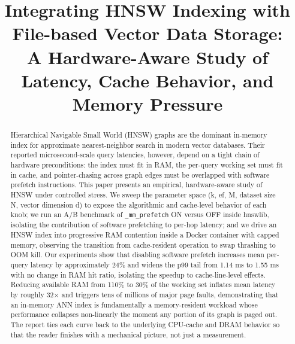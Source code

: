 \documentclass[conference]{IEEEtran}
\begin{document}
\title{Integrating HNSW Indexing with File-based Vector Data Storage:\\
A Hardware-Aware Study of Latency, Cache Behavior, and Memory Pressure}

\author{
\and
{}
}

\maketitle

\begin{abstract}
Hierarchical Navigable Small World (HNSW) graphs are the dominant in-memory
index for approximate nearest-neighbor search in modern vector databases.
Their reported microsecond-scale query latencies, however, depend on a tight
chain of hardware preconditions: the index must fit in RAM, the per-query
working set must fit in cache, and pointer-chasing across graph edges must be
overlapped with software prefetch instructions. This paper presents an
empirical, hardware-aware study of HNSW under controlled stress. We
sweep the parameter space (k, ef, M, dataset size N, vector dimension d)
to expose the algorithmic and cache-level behavior of each knob; we run an
A/B benchmark of \texttt{\_mm\_prefetch} ON versus OFF inside hnswlib,
isolating the contribution of software prefetching to per-hop latency; and
we drive an HNSW index into progressive RAM contention inside a Docker
container with capped memory, observing the transition from cache-resident
operation to swap thrashing to OOM kill. Our experiments show that
disabling software prefetch increases mean per-query latency by
approximately 24\% and widens the p99 tail from 1.14 ms to 1.55 ms with no
change in RAM hit ratio, isolating the speedup to cache-line-level effects.
Reducing available RAM from 110\% to 30\% of the working set inflates mean
latency by roughly 32$\times$ and triggers tens of millions of major page
faults, demonstrating that an in-memory ANN index is fundamentally a
memory-resident workload whose performance collapses non-linearly the
moment any portion of its graph is paged out. The report ties each curve
back to the underlying CPU-cache and DRAM behavior so that the reader
finishes with a mechanical picture, not just a measurement.
\end{abstract}
\end{document}
